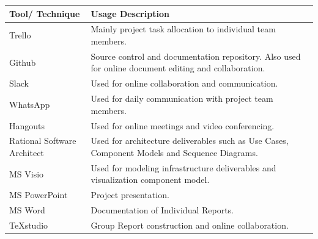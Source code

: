\documentclass[12pt]{article} %
\begin{document}
\begin{center}
	\begin{tabular}{ | p{3.5cm} | p{12cm} |}
		\hline
		\textbf{Tool/ Technique} & \textbf{Usage Description} \\
		\hline
		Trello & Mainly project task allocation to individual team members.\\
		\hline
		Github & Source control and documentation repository. Also used for online document editing and collaboration.\\
		\hline
		Slack & Used for online collaboration and communication.\\
		\hline
		WhatsApp & Used for daily communication with project team members.\\
		\hline
		Hangouts & Used for online meetings and video conferencing.\\
		\hline
		Rational Software Architect & Used for architecture deliverables such as Use Cases, Component Models and Sequence Diagrams.\\
		\hline
		MS Visio & Used for modeling infrastructure deliverables and visualization component model.\\
		\hline
		MS PowerPoint & Project presentation.\\
		\hline
		MS Word & Documentation of Individual Reports.\\
		\hline
		TeXstudio & Group Report construction and online collaboration.\\
		\hline

	\end{tabular}
\end{center}
	
\end{document}
